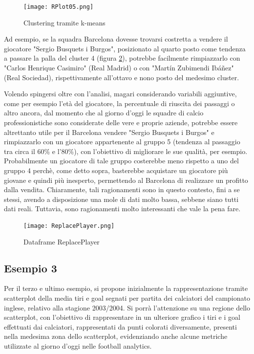             \begin{figure}[h]
                \texttt{[image: RPlot05.png]}
                \centering
                \caption{Clustering tramite k-means}
                \label{fig:Clustering}
            \end{figure}

            Ad esempio, se la squadra Barcelona dovesse trovarsi costretta a vendere il giocatore "Sergio Busquets i Burgos", posizionato al quarto posto come tendenza a passare la palla del cluster 4 (figura \ref{fig:ReplacePlayer}), potrebbe facilmente rimpiazzarlo con "Carlos Henrique Casimiro" (Real Madrid) o con "Martín Zubimendi Ibáñez" (Real Sociedad), rispettivamente all'ottavo e nono posto del medesimo cluster. 
            
            Volendo spingersi oltre con l'analisi, magari considerando variabili aggiuntive, come per esempio l'età del giocatore, la percentuale di riuscita dei passaggi o altro ancora, dal momento che al giorno d'oggi le squadre di calcio professionistiche sono considerate delle vere e proprie aziende, potrebbe essere altrettanto utile per il Barcelona vendere "Sergio Busquets i Burgos" e rimpiazzarlo con un giocatore appartenente al gruppo 5 (tendenza al passaggio tra circa il 60\% e l'80\%), con l'obiettivo di migliorare le sue qualità, per esempio. Probabilmente un giocatore di tale gruppo costerebbe meno rispetto a uno del gruppo 4 perchè, come detto sopra, basterebbe acquistare un giocatore più giovane e quindi più inesperto, permettendo al Barcelona di realizzare un profitto dalla vendita. Chiaramente, tali ragionamenti sono in questo contesto, fini a se stessi, avendo a disposizione una mole di dati molto bassa, sebbene siano tutti dati reali. Tuttavia, sono ragionamenti molto interessanti che vale la pena fare.
            
            \vspace{10pt}
            
            \begin{figure}[h]
                \texttt{[image: ReplacePlayer.png]}
                \centering
                \caption{Dataframe ReplacePlayer}
                \label{fig:ReplacePlayer}
            \end{figure}
            
        
        \subsection{Esempio 3}
            Per il terzo e ultimo esempio, si propone inizialmente la rappresentazione tramite scatterplot della media tiri e goal segnati per partita dei calciatori del campionato inglese, relativo alla stagione 2003/2004. Si porrà l'attenzione su una regione dello scatterplot, con l'obiettivo di rappresentare in un ulteriore grafico i tiri e i goal effettuati dai calciatori, rappresentati da punti colorati diversamente, presenti nella medesima zona dello scatterplot, evidenziando anche alcune metriche utilizzate al giorno d'oggi nelle football analytics.

